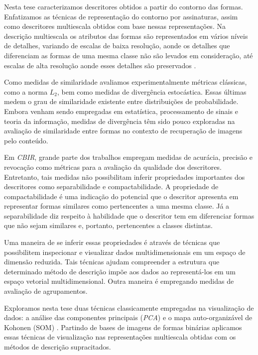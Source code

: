 Nesta tese caracterizamos descritores obtidos a partir do contorno das formas.  Enfatizamos as técnicas de representação do contorno por assinaturas, assim como descritores multiescala obtidos com base nessas representações. Na descrição multiescala os atributos das formas são representados em vários níveis de detalhes, variando de escalas de baixa resolução, aonde os detalhes que diferenciam as formas de uma mesma classe não são levados em consideração, até escalas de alta resolução aonde esses detalhes são preservados \cite{Ullman:1996}.
 
Como medidas de similaridade avaliamos experimentalmente métricas clássicas, como a norma $L_2$, bem como medidas de divergência estocástica. Essas últimas medem o grau de similaridade existente entre distribuições de probabilidade. Embora venham sendo empregadas em estatística, processamento de sinais e teoria da informação, medidas de divergência têm sido pouco exploradas na avaliação de similaridade entre formas no contexto de recuperação de imagens pelo conteúdo.  

Em \emph{CBIR}, grande parte dos trabalhos empregam medidas de acurácia, precisão e revocação como métricas para a avaliação da qualidade dos descritores. Entretanto, tais medidas não possibilitam inferir propriedades importantes dos descritores como separabilidade e compactabilidade. A propriedade de compactabilidade é uma indicação do potencial que o descritor apresenta em representar formas similares como pertencentes a uma mesma classe. Já a separabilidade diz respeito à habilidade que o descritor tem em diferenciar formas que não sejam similares e, portanto, pertencentes a classes distintas. 

Uma maneira de se inferir essas propriedades é através de técnicas que possibilitem inspecionar e visualizar dados multidimensionais em um espaço de dimensão reduzida. Tais técnicas ajudam  compreender a estrutura que determinado método de descrição impõe aos dados ao representá-los em um espaço vetorial multidimensional. Outra maneira é empregando medidas de avaliação de agrupamentos. 

Exploramos nesta tese duas técnicas classicamente empregadas na visualização de dados: a análise das componentes principais (\emph{PCA}) e o mapa auto-organizável de Kohonen (SOM) \cite{Kohonen:1982}. Partindo de bases de imagens de formas binárias aplicamos essas técnicas de visualização nas representações multiescala obtidas com os métodos de descrição supracitados.   
 



